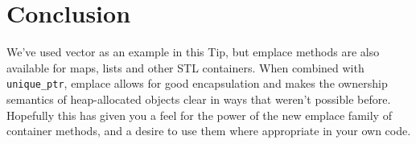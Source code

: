 \section{Conclusion}
We’ve used vector as an example in this Tip, but emplace methods are also available for maps, lists and other STL containers. When combined with \texttt{unique_ptr}, emplace allows for good encapsulation and makes the ownership semantics of heap-allocated objects clear in ways that weren’t possible before. Hopefully this has given you a feel for the power of the new emplace family of container methods, and a desire to use them where appropriate in your own code.





